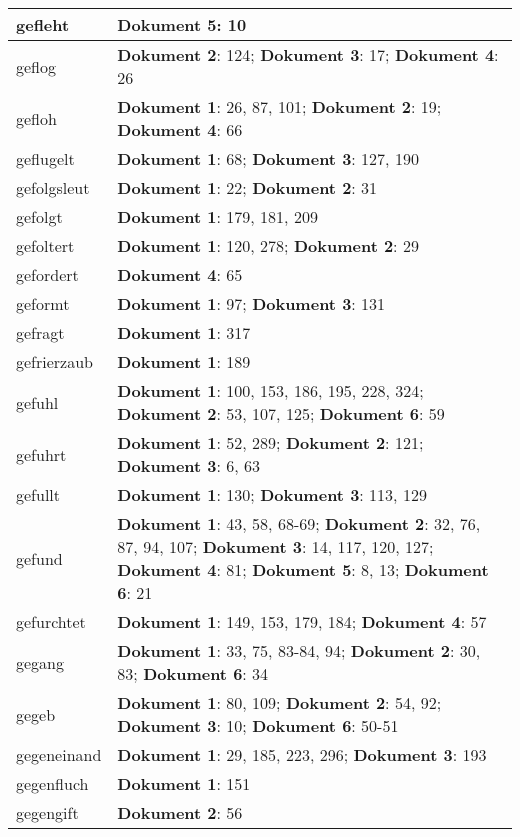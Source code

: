 \documentclass[a5paper]{article}
\begin{document}
\begin{longtable}[l]{|l|p{3in}|}
\hline
gefleht & \textbf{Dokument 5}: 10 \\
\hline
geflog & \textbf{Dokument 2}: 124; \textbf{Dokument 3}: 17; \textbf{Dokument 4}: 26 \\
\hline
gefloh & \textbf{Dokument 1}: 26, 87, 101; \textbf{Dokument 2}: 19; \textbf{Dokument 4}: 66 \\
\hline
geflugelt & \textbf{Dokument 1}: 68; \textbf{Dokument 3}: 127, 190 \\
\hline
gefolgsleut & \textbf{Dokument 1}: 22; \textbf{Dokument 2}: 31 \\
\hline
gefolgt & \textbf{Dokument 1}: 179, 181, 209 \\
\hline
gefoltert & \textbf{Dokument 1}: 120, 278; \textbf{Dokument 2}: 29 \\
\hline
gefordert & \textbf{Dokument 4}: 65 \\
\hline
geformt & \textbf{Dokument 1}: 97; \textbf{Dokument 3}: 131 \\
\hline
gefragt & \textbf{Dokument 1}: 317 \\
\hline
gefrierzaub & \textbf{Dokument 1}: 189 \\
\hline
gefuhl & \textbf{Dokument 1}: 100, 153, 186, 195, 228, 324; \textbf{Dokument 2}: 53, 107, 125; \textbf{Dokument 6}: 59 \\
\hline
gefuhrt & \textbf{Dokument 1}: 52, 289; \textbf{Dokument 2}: 121; \textbf{Dokument 3}: 6, 63 \\
\hline
gefullt & \textbf{Dokument 1}: 130; \textbf{Dokument 3}: 113, 129 \\
\hline
gefund & \textbf{Dokument 1}: 43, 58, 68-69; \textbf{Dokument 2}: 32, 76, 87, 94, 107; \textbf{Dokument 3}: 14, 117, 120, 127; \textbf{Dokument 4}: 81; \textbf{Dokument 5}: 8, 13; \textbf{Dokument 6}: 21 \\
\hline
gefurchtet & \textbf{Dokument 1}: 149, 153, 179, 184; \textbf{Dokument 4}: 57 \\
\hline
gegang & \textbf{Dokument 1}: 33, 75, 83-84, 94; \textbf{Dokument 2}: 30, 83; \textbf{Dokument 6}: 34 \\
\hline
gegeb & \textbf{Dokument 1}: 80, 109; \textbf{Dokument 2}: 54, 92; \textbf{Dokument 3}: 10; \textbf{Dokument 6}: 50-51 \\
\hline
gegeneinand & \textbf{Dokument 1}: 29, 185, 223, 296; \textbf{Dokument 3}: 193 \\
\hline
gegenfluch & \textbf{Dokument 1}: 151 \\
\hline
gegengift & \textbf{Dokument 2}: 56 \\

\end{longtable}
\end{document}
